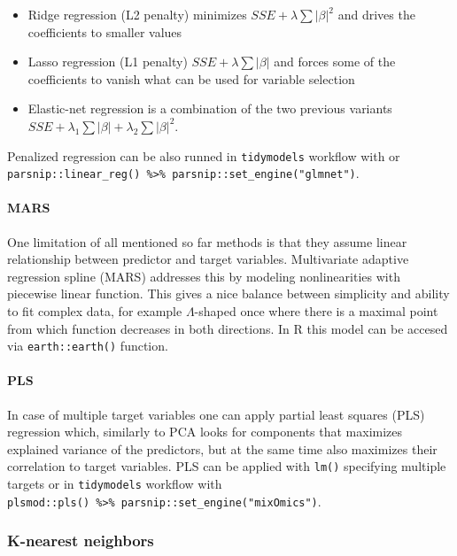 \documentclass[
]{book}
\providecommand{\tightlist}{%
  \setlength{\itemsep}{0pt}\setlength{\parskip}{0pt}}
\begin{document}
\begin{itemize}
\tightlist
\item
  Ridge regression (L2 penalty) minimizes \(SSE + \lambda \sum|\beta|^2\) and drives
  the coefficients to smaller values
\item
  Lasso regression (L1 penalty) \(SSE + \lambda \sum|\beta|\) and forces some of the
  coefficients to vanish what can be used for variable selection
\item
  Elastic-net regression is a combination of the two previous variants
  \(SSE + \lambda_1 \sum|\beta| + \lambda_2 \sum|\beta|^2\).
\end{itemize}

Penalized regression can be also runned in \texttt{tidymodels} workflow with
or \texttt{parsnip::linear\_reg()\ \%\textgreater{}\%\ parsnip::set\_engine("glmnet")}.

\hypertarget{mars}{%
\paragraph{MARS}\label{mars}}

One limitation of all mentioned so far methods is that they assume linear relationship
between predictor and target variables. Multivariate adaptive regression spline (MARS)
addresses this by modeling nonlinearities with piecewise linear function. This
gives a nice balance between simplicity and ability to fit complex data, for example
\(\Lambda\)-shaped once where there is a maximal point from which function decreases
in both directions. In R this model can be accesed via \texttt{earth::earth()} function.

\hypertarget{pls}{%
\paragraph{PLS}\label{pls}}

In case of multiple target variables one can apply partial least squares (PLS) regression
which, similarly to PCA looks for components that maximizes explained variance of
the predictors, but at the same time also maximizes their correlation to target variables.
PLS can be applied with \texttt{lm()} specifying multiple targets or in \texttt{tidymodels} workflow
with \texttt{plsmod::pls()\ \%\textgreater{}\%\ parsnip::set\_engine("mixOmics")}.

\hypertarget{k-nearest-neighbors}{%
\subsubsection{K-nearest neighbors}\label{k-nearest-neighbors}}
\end{document}
